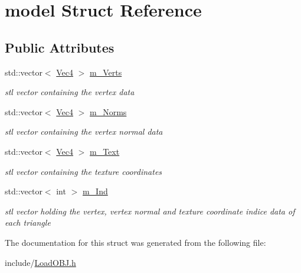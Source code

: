 \hypertarget{structmodel}{
\section{model Struct Reference}
\label{structmodel}
}
\subsection*{Public Attributes}
\begin{DoxyCompactItemize}
\item 
\hypertarget{structmodel_af5439d19dffc9809f5bacc72c30c2df6}{
std::vector$<$ \hyperlink{classVec4}{Vec4} $>$ \hyperlink{structmodel_af5439d19dffc9809f5bacc72c30c2df6}{m\_\-Verts}}
\label{structmodel_af5439d19dffc9809f5bacc72c30c2df6}

\begin{DoxyCompactList}\small\item\em stl vector containing the vertex data \item\end{DoxyCompactList}\item 
\hypertarget{structmodel_a722308c5b9a237c79f17c048cd7ef539}{
std::vector$<$ \hyperlink{classVec4}{Vec4} $>$ \hyperlink{structmodel_a722308c5b9a237c79f17c048cd7ef539}{m\_\-Norms}}
\label{structmodel_a722308c5b9a237c79f17c048cd7ef539}

\begin{DoxyCompactList}\small\item\em stl vector containing the vertex normal data \item\end{DoxyCompactList}\item 
\hypertarget{structmodel_acf799b50980a556cc3d2fd16175555e3}{
std::vector$<$ \hyperlink{classVec4}{Vec4} $>$ \hyperlink{structmodel_acf799b50980a556cc3d2fd16175555e3}{m\_\-Text}}
\label{structmodel_acf799b50980a556cc3d2fd16175555e3}

\begin{DoxyCompactList}\small\item\em stl vector containing the texture coordinates \item\end{DoxyCompactList}\item 
\hypertarget{structmodel_a7e7c6aeecfd178050b6777493d666ef5}{
std::vector$<$ int $>$ \hyperlink{structmodel_a7e7c6aeecfd178050b6777493d666ef5}{m\_\-Ind}}
\label{structmodel_a7e7c6aeecfd178050b6777493d666ef5}

\begin{DoxyCompactList}\small\item\em stl vector holding the vertex, vertex normal and texture coordinate indice data of each triangle \item\end{DoxyCompactList}\end{DoxyCompactItemize}


The documentation for this struct was generated from the following file:\begin{DoxyCompactItemize}
\item 
include/\hyperlink{LoadOBJ_8h}{LoadOBJ.h}\end{DoxyCompactItemize}
